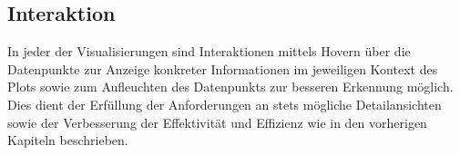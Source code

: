 \documentclass[usegeometry=true]{scrartcl}
\begin{document}




\subsection{Interaktion}
In jeder der Visualisierungen sind Interaktionen mittels Hovern über die Datenpunkte zur Anzeige konkreter Informationen im jeweiligen Kontext des Plots sowie zum Aufleuchten des Datenpunkts zur besseren Erkennung möglich.
Dies dient der Erfüllung der Anforderungen an stets mögliche Detailansichten sowie der Verbesserung der Effektivität und Effizienz wie in den vorherigen Kapiteln beschrieben.
\end{document}
